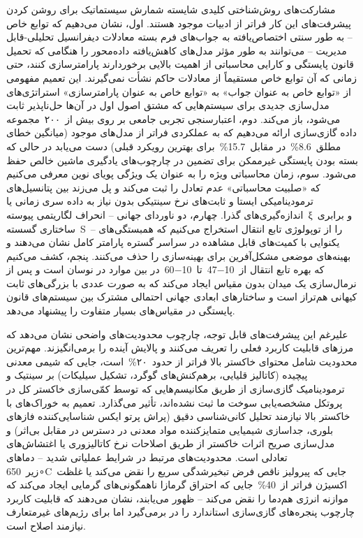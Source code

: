 \documentclass[12pt, a4paper]{article}
\begin{document}
مشارکت‌های روش‌شناختی کلیدی شایسته شمارش سیستماتیک برای روشن کردن پیشرفت‌های این کار فراتر از ادبیات موجود هستند. اول، نشان می‌دهیم که توابع خاص – به طور سنتی اختصاص‌یافته به جواب‌های فرم بسته معادلات دیفرانسیل تحلیلی-قابل مدیریت – می‌توانند به طور مؤثر مدل‌های کاهش‌یافته داده‌محور را هنگامی که تحمیل قانون پایستگی و کارایی محاسباتی از اهمیت بالایی برخوردارند پارامترسازی کنند، حتی زمانی که آن توابع خاص مستقیماً از معادلات حاکم نشأت نمی‌گیرند. این تعمیم مفهومی از «توابع خاص به عنوان جواب» به «توابع خاص به عنوان پارامترسازی» استراتژی‌های مدل‌سازی جدیدی برای سیستم‌هایی که مشتق اصول اول در آن‌ها حل‌ناپذیر ثابت می‌شود، باز می‌کند. دوم، اعتبارسنجی تجربی جامعی بر روی بیش از ۲۰۰ مجموعه داده گازی‌سازی ارائه می‌دهیم که به عملکردی فراتر از مدل‌های موجود (میانگین خطای مطلق 8.6\% در مقابل 15.7\% برای بهترین رویکرد قبلی) دست می‌یابد در حالی که بسته بودن پایستگی غیرممکن برای تضمین در چارچوب‌های یادگیری ماشین خالص حفظ می‌شود. سوم، زمان محاسباتی ویژه را به عنوان یک ویژگی پویای نوین معرفی می‌کنیم که «صلبیت محاسباتی» عدم تعادل را ثبت می‌کند و پل می‌زند بین پتانسیل‌های ترمودینامیکی ایستا و ثابت‌های نرخ سینتیکی بدون نیاز به داده سری زمانی یا اندازه‌گیری‌های گذرا. چهارم، دو ناوردای جهانی – انحراف لگاریتمی پیوسته ξ و برابری ساختاری گسسته S – را از توپولوژی تابع انتقال استخراج می‌کنیم که همبستگی‌های یکنوایی با کمیت‌های قابل مشاهده در سراسر گستره پارامتر کامل نشان می‌دهند و بهینه‌های موضعی مشکل‌آفرین برای بهینه‌سازی را حذف می‌کنند. پنجم، کشف می‌کنیم که بهره تابع انتقال از 10−47 تا 10−60 در بین موارد در نوسان است و پس از نرمال‌سازی یک میدان بدون مقیاس ایجاد می‌کند که به صورت عددی با بزرگی‌های ثابت کیهانی هم‌تراز است و ساختارهای ابعادی جهانی احتمالی مشترک بین سیستم‌های قانون پایستگی در مقیاس‌های بسیار متفاوت را پیشنهاد می‌دهد.

علیرغم این پیشرفت‌های قابل توجه، چارچوب محدودیت‌های واضحی نشان می‌دهد که مرزهای قابلیت کاربرد فعلی را تعریف می‌کنند و پالایش آینده را برمی‌انگیزند. مهم‌ترین محدودیت شامل محتوای خاکستر بالا فراتر از حدود ۲۰\% است، جایی که شیمی معدنی پیچیده (کاتالیز قلیایی، برهم‌کنش‌های گوگرد، تشکیل سیلیکات) بر سینتیک و ترمودینامیک گازی‌سازی از طریق مکانیسم‌هایی که توسط کمّی‌سازی خاکستر کل در پروتکل مشخصه‌یابی سوخت ما ثبت نشده‌اند، تأثیر می‌گذارد. تعمیم به خوراک‌های با خاکستر بالا نیازمند تحلیل کانی‌شناسی دقیق (پراش پرتو ایکس شناسایی‌کننده فازهای بلوری، جداسازی شیمیایی متمایزکننده مواد معدنی در دسترس در مقابل بی‌اثر) و مدل‌سازی صریح اثرات خاکستر از طریق اصلاحات نرخ کاتالیزوری یا اغتشاش‌های تعادلی است. محدودیت‌های مرتبط در شرایط عملیاتی شدید – دماهای زیر 650∘C جایی که پیرولیز ناقص فرض تبخیرشدگی سریع را نقض می‌کند یا غلظت اکسیژن فراتر از 40\% جایی که احتراق گرمازا ناهمگونی‌های گرمایی ایجاد می‌کند که موازنه انرژی هم‌دما را نقض می‌کند – ظهور می‌یابند، نشان می‌دهند که قابلیت کاربرد چارچوب پنجره‌های گازی‌سازی استاندارد را در برمی‌گیرد اما برای رژیم‌های غیرمتعارف نیازمند اصلاح است.
\end{document}
